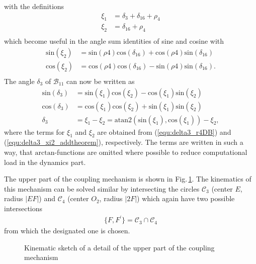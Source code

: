 \documentclass[letterpaper, 10 pt, conference]{ieeeconf}  %
\newcommand{\body}[1]{\mathcal{B}_{#1}}
\newcommand{\cc}[1]{\mathcal{C}_{#1}}
\begin{document}
%
with the definitions
%
\begin{align}
\xi_1 &= \delta_3+\delta_{16}+\rho_4 \nonumber \\
\xi_2 &= \delta_{16}+\rho_4 \nonumber \\
\label{equ:delta3_xi_def}
\end{align}
%
which become useful in the angle sum identities of sine and cosine with
%
\begin{align}
\mathrm{sin}(\xi_2)&=\mathrm{sin}(\rho4)\mathrm{cos}(\delta_{16})+\mathrm{cos}(\rho4)\mathrm{sin}(\delta_{16}) \nonumber \\
\mathrm{cos}(\xi_2)&=\mathrm{cos}(\rho4)\mathrm{cos}(\delta_{16})-\mathrm{sin}(\rho4)\mathrm{sin}(\delta_{16}). \nonumber \\
\label{equ:delta3_xi2_addtheorem}
\end{align}
%
The angle $\delta_3$ of $\body{11}$ can now be written as
%
\begin{align}
\mathrm{sin}(\delta_3) &= \mathrm{sin}(\xi_1)\mathrm{cos}(\xi_2)-\mathrm{cos}(\xi_1)\mathrm{sin}(\xi_2)\\
\mathrm{cos}(\delta_3) &= \mathrm{cos}(\xi_1)\mathrm{cos}(\xi_2)+\mathrm{sin}(\xi_1)\mathrm{sin}(\xi_2)\\
\delta_3 &= \xi_1 - \xi_2 =  \mathrm{atan2}(\mathrm{sin}(\xi_1),\mathrm{cos}(\xi_1)) - \xi_2 ,
\label{equ:delta3_explicit}
\end{align}
%
where the terms for $\xi_1$ and $\xi_2$ are obtained from (\ref{equ:delta3_r4DB}) and (\ref{equ:delta3_xi2_addtheorem}), respectively.
The terms are written in such a way, that $\mathrm{arctan}$-functions are omitted where possible to reduce computational load in the dynamics part.

The upper part of the coupling mechanism is shown in Fig.\,\ref{fig:KAS5_upper_coupling}. The kinematics of this mechanism can be solved similar by intersecting the circles $\cc{3}$ (center $E$, radius $|EF|$) and $\cc{4}$ (center $O_2$, radius $|2F|$) which again have two possible intersections
%
\begin{align}
\{F, F^\prime\} = \cc{3} \cap \cc{4}
\end{align}
%
from which the designated one is chosen.
%

\begin{figure}[htb]
    \small
    \begin{minipage}[t]{7.5cm}
        \vspace{0.2cm} %
        
    \end{minipage}
    
    \caption{Kinematic sketch of a detail of the upper part of the coupling mechanism}
    \label{fig:KAS5_upper_coupling}
\end{figure}
\end{document}

